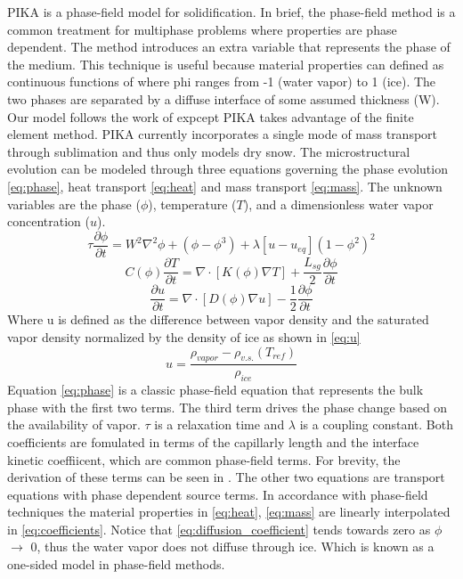 \documentclass[twoside]{article}
\begin{document}
\begin{multicols}{2}
PIKA is a phase-field model for solidification. In brief, the phase-field method is a common treatment for multiphase problems where properties are phase dependent. The method introduces an extra variable that represents the phase of the medium. This technique is useful because material properties can defined as continuous functions of where phi ranges from -1 (water vapor) to 1 (ice). The two phases are separated by a diffuse interface of some assumed thickness (W). Our model follows the work of \cite{Plapp_2009} expcept PIKA takes advantage of the finite element method. 
PIKA currently incorporates a single mode of mass transport through sublimation and thus only models dry snow. The microstructural evolution can be modeled through three equations governing the phase evolution \eqref{eq:phase}, heat transport \eqref{eq:heat} and mass transport \eqref{eq:mass}. The unknown variables are the phase ($\phi$), temperature ($T$), and a dimensionless water vapor concentration ($u$).
 \begin{equation} \label{eq:phase}
	\tau \frac{\partial \phi}{\partial t} = W^2 \nabla^2 \phi +(\phi-\phi^3)+\lambda[u-u_{eq}](1-\phi^2)^2 
\end{equation}
\begin{equation}\label{eq:heat}
	C(\phi)\frac{\partial T}{\partial t} = \nabla \cdot [K(\phi) \nabla T] + \frac{L_{sg}}{2}\frac{\partial \phi}{\partial t}
\end{equation} 
\begin{equation} \label{eq:mass}
	\frac{\partial u}{\partial t} = \nabla \cdot[ D(\phi) \nabla u] - \frac{1}{2}\frac{\partial \phi}{\partial t}
\end{equation}
Where u is defined as the difference between vapor density and the saturated vapor density normalized by the density of ice as shown in \eqref{eq:u}
\begin{equation} \label{eq:u}
	u = \frac{ \rho_{vapor}-\rho_{v.s.} (T_{ref})}{\rho_{ice}}
\end{equation}
Equation \eqref{eq:phase} is a classic phase-field equation that represents the bulk phase with the first two terms. The third term drives the phase change based on the availability of vapor. $\tau$ is a relaxation time and $\lambda$ is a coupling constant. Both coefficients are fomulated in terms of the capillarly length and the interface kinetic coeffiicent, which are common phase-field terms. For brevity, the derivation of these terms can be seen in \cite{Plapp_2009}. The other two equations are transport equations with phase dependent source terms. In accordance with phase-field techniques the material properties in  \eqref{eq:heat}, \eqref{eq:mass} are linearly interpolated in \eqref{eq:coefficients}. Notice that \ref{eq:diffusion_coefficient} tends towards zero as $\phi$ $\rightarrow$ 0, thus the water vapor does not diffuse through ice. Which is known as a one-sided model in phase-field methods.

\end{multicols}
\end{document}
